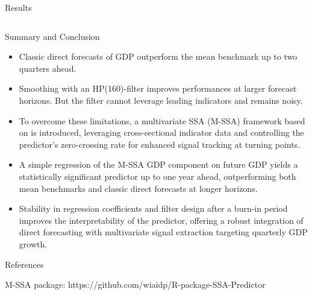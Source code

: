 \documentclass[final]{beamer}
\begin{document}
\begin{frame}
\begin{columns}[T]
\begin{column}{0.48\textwidth}
\begin{block}{\large{Results}}
\begin{columns}
\begin{center}
	     \end{center}
    
\end{columns}
   
			
			\end{block}
			
			\begin{block}{\large Summary and Conclusion}
				
			\begin{itemize}
            \item Classic direct forecasts of GDP outperform the mean benchmark up to two quarters ahead.  
            \item Smoothing with an HP(160)-filter improves performances at larger forecast horizons. But the filter cannot leverage leading indicators and remains noisy.
            \item To overcome these limitations, a multivariate SSA (M-SSA) framework based on \cite{Wildi2024} is introduced, leveraging cross-sectional indicator data and controlling the predictor’s zero-crossing rate for enhanced signal tracking at turning points.
            \item A simple regression of the M-SSA GDP component on future GDP yields a statistically significant predictor up to one year ahead, outperforming both mean benchmarks and classic direct forecasts at longer horizons.
            \item Stability in regression coefficients and filter design after a burn-in period improves the interpretability of the predictor, offering a robust integration of direct forecasting with multivariate signal extraction targeting quarterly GDP growth.
        \end{itemize}
			\end{block}
			
	
	
	 \begin{block}{\large References}
	
    \begin{small}
        
          
        M-SSA package: https://github.com/wiaidp/R-package-SSA-Predictor    
        \end{small}
	
   
    \end{block}
		\end{column}
  
  
\end{columns}

\end{frame}
\end{document}
